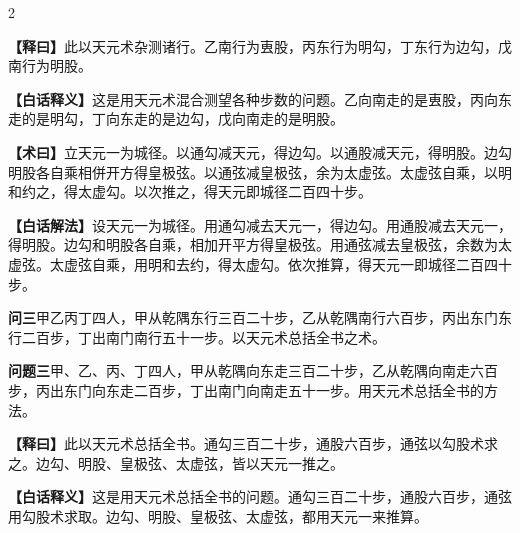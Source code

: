 \documentclass[11pt,a4paper]{article}
\newcommand{\WenQuestion}[1]{\textbf{\textcolor{classicalcolor}{#1}}}
\newcommand{\BaiQuestion}[1]{\textbf{\textcolor{moderncolor}{#1}}}
\newcommand{\WenExplain}{\textcolor{classicalcolor}{\textbf{【释曰】}}}
\newcommand{\BaiExplain}{\textcolor{moderncolor}{\textbf{【白话释义】}}}
\newcommand{\WenMethod}{\textcolor{classicalcolor}{\textbf{【术曰】}}}
\newcommand{\BaiMethod}{\textcolor{moderncolor}{\textbf{【白话解法】}}}
\begin{document}
\begin{paracol}{2}
\switchcolumn*
\begin{tcolorbox}[colback=red!5,colframe=red!30!black,boxrule=0.3pt]
\WenExplain\quad 此以天元术杂测诸行。乙南行为叀股，丙东行为明勾，丁东行为边勾，戊南行为明股。
\end{tcolorbox}
\switchcolumn
\begin{tcolorbox}[colback=blue!5,colframe=blue!30!black,boxrule=0.3pt]
\BaiExplain\quad 这是用天元术混合测望各种步数的问题。乙向南走的是叀股，丙向东走的是明勾，丁向东走的是边勾，戊向南走的是明股。
\end{tcolorbox}

\switchcolumn*
\begin{tcolorbox}[colback=red!5,colframe=red!40!black,boxrule=0.3pt]
\WenMethod\quad 立天元一为城径。以通勾减天元，得边勾。以通股减天元，得明股。边勾明股各自乘相併开方得皇极弦。以通弦减皇极弦，余为太虚弦。太虚弦自乘，以明和约之，得太虚勾。以次推之，得天元即城径二百四十步。
\end{tcolorbox}
\switchcolumn
\begin{tcolorbox}[colback=blue!5,colframe=blue!40!black,boxrule=0.3pt]
\BaiMethod\quad 设天元一为城径。用通勾减去天元一，得边勾。用通股减去天元一，得明股。边勾和明股各自乘，相加开平方得皇极弦。用通弦减去皇极弦，余数为太虚弦。太虚弦自乘，用明和去约，得太虚勾。依次推算，得天元一即城径二百四十步。
\end{tcolorbox}

\vspace{0.8em}

\switchcolumn*
\begin{tcolorbox}[colback=red!3,colframe=red!30!black,boxrule=0.3pt]
\WenQuestion{问三}\quad 甲乙丙丁四人，甲从乾隅东行三百二十步，乙从乾隅南行六百步，丙出东门东行二百步，丁出南门南行五十一步。以天元术总括全书之术。
\end{tcolorbox}
\switchcolumn
\begin{tcolorbox}[colback=blue!3,colframe=blue!30!black,boxrule=0.3pt]
\BaiQuestion{问题三}\quad 甲、乙、丙、丁四人，甲从乾隅向东走三百二十步，乙从乾隅向南走六百步，丙出东门向东走二百步，丁出南门向南走五十一步。用天元术总括全书的方法。
\end{tcolorbox}

\switchcolumn*
\begin{tcolorbox}[colback=red!5,colframe=red!30!black,boxrule=0.3pt]
\WenExplain\quad 此以天元术总括全书。通勾三百二十步，通股六百步，通弦以勾股术求之。边勾、明股、皇极弦、太虚弦，皆以天元一推之。
\end{tcolorbox}
\switchcolumn
\begin{tcolorbox}[colback=blue!5,colframe=blue!30!black,boxrule=0.3pt]
\BaiExplain\quad 这是用天元术总括全书的问题。通勾三百二十步，通股六百步，通弦用勾股术求取。边勾、明股、皇极弦、太虚弦，都用天元一来推算。
\end{tcolorbox}


\end{paracol}
\end{document}

